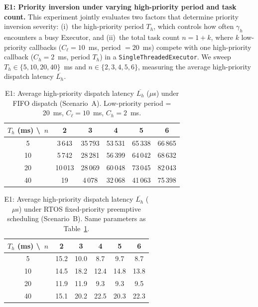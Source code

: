 \textbf{E1: Priority inversion under varying high-priority period and task count.}
This experiment jointly evaluates two factors that determine priority inversion severity: (i)~the high-priority period $T_h$, which controls how often $\gamma_h$ encounters a busy Executor, and (ii)~the total task count $n = 1 + k$, where $k$ low-priority callbacks ($C_\ell = 10$~ms, period $= 20$~ms) compete with one high-priority callback ($C_h = 2$~ms, period $T_h$) in a \texttt{SingleThreadedExecutor}. We sweep $T_h \in \{5, 10, 20, 40\}$~ms and $n \in \{2, 3, 4, 5, 6\}$, measuring the average high-priority dispatch latency $\overline{L_h}$.

\begin{table}[t]
\centering
\caption{E1: Average high-priority dispatch latency $\overline{L_h}$ ($\mu$s) under FIFO dispatch (Scenario~A). Low-priority period = 20~ms, $C_\ell = 10$~ms, $C_h = 2$~ms.}
\label{tab:e1_fifo}
\begin{tabular}{c|ccccc}
\hline
$T_h$ (ms) \textbackslash\ $n$ & 2 & 3 & 4 & 5 & 6 \\
\hline
5   & 3\,643   & 35\,793  & 53\,531  & 65\,338  & 66\,865 \\
10  & 5\,742   & 28\,281  & 56\,399  & 64\,042  & 68\,632 \\
20  & 10\,013  & 28\,069  & 60\,048  & 73\,045  & 82\,043 \\
40  & 19       & 4\,078   & 32\,068  & 41\,063  & 75\,398 \\
\hline
\end{tabular}
\end{table}

\begin{table}[t]
\centering
\caption{E1: Average high-priority dispatch latency $\overline{L_h}$ ($\mu$s) under RTOS fixed-priority preemptive scheduling (Scenario~B). Same parameters as Table~\ref{tab:e1_fifo}.}
\label{tab:e1_rtos}
\begin{tabular}{c|ccccc}
\hline
$T_h$ (ms) \textbackslash\ $n$ & 2 & 3 & 4 & 5 & 6 \\
\hline
5   & 15.2 & 10.0 & 8.7 & 9.7 & 8.7 \\
10  & 14.5 & 18.2 & 12.4 & 14.8 & 13.8 \\
20  & 11.9 & 11.9 & 9.3 & 9.3 & 9.5 \\
40  & 15.1 & 20.2 & 22.5 & 20.3 & 22.3 \\
\hline
\end{tabular}
\end{table}


